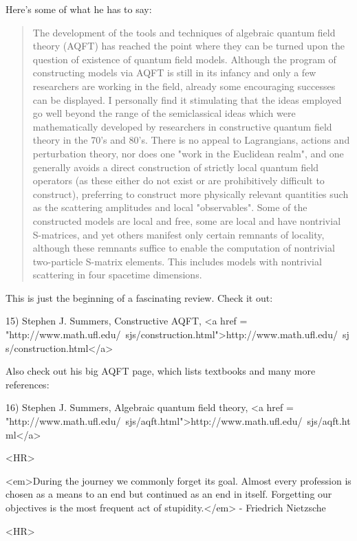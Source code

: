 Here's some of what he has to say:

\begin{quote}
The development of the tools and techniques of algebraic quantum field
theory (AQFT) has reached the point where they can be turned upon the
question of existence of quantum field models. Although the program of
constructing models via AQFT is still in its infancy and only a few
researchers are working in the field, already some encouraging
successes can be displayed. I personally find it stimulating that the
ideas employed go well beyond the range of the semiclassical ideas
which were mathematically developed by researchers in constructive
quantum field theory in the 70's and 80's. There is no appeal to
Lagrangians, actions and perturbation theory, nor does one "work in
the Euclidean realm", and one generally avoids a direct construction
of strictly local quantum field operators (as these either do not
exist or are prohibitively difficult to construct), preferring to
construct more physically relevant quantities such as the scattering
amplitudes and local "observables". Some of the constructed models are
local and free, some are local and have nontrivial S-matrices, and yet
others manifest only certain remnants of locality, although these
remnants suffice to enable the computation of nontrivial two-particle
S-matrix elements. This includes models with nontrivial scattering in
four spacetime dimensions.
\end{quote}
    

This is just the beginning of a fascinating review.
Check it out:

15) Stephen J. Summers, Constructive AQFT, 
<a href = "http://www.math.ufl.edu/~sjs/construction.html">http://www.math.ufl.edu/~sjs/construction.html</a>

Also check out his big AQFT page, which lists textbooks and
many more references:

16) Stephen J. Summers, Algebraic quantum field theory,
<a href = "http://www.math.ufl.edu/~sjs/aqft.html">http://www.math.ufl.edu/~sjs/aqft.html</a>



<HR>

<em>During the journey we commonly forget its goal. Almost every
profession is chosen as a means to an end but continued as an end in
itself.  Forgetting our objectives is the most frequent act of
stupidity.</em> - Friedrich Nietzsche

<HR>




